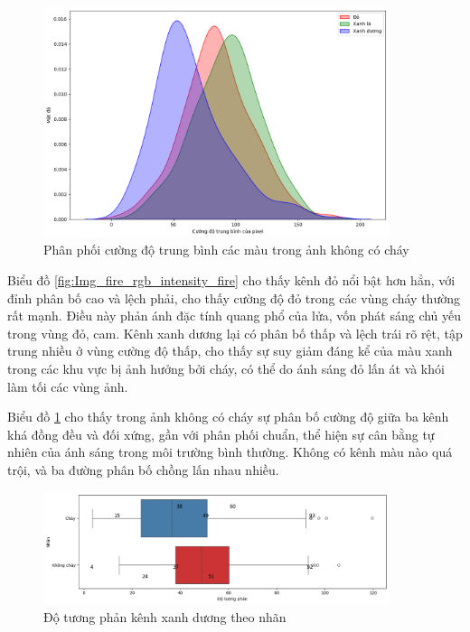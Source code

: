     \begin{figure}[htp]
        \centering
        \includegraphics[width=0.90\textwidth]{images/Img_fire_rgb_intensity_nonfire.png}
        \caption{Phân phối cường độ trung bình các màu trong ảnh không có cháy}
        \label{fig:Img_fire_rgb_intensity_nonfire}
    \end{figure}
    \FloatBarrier

    Biểu đồ \ref{fig:Img_fire_rgb_intensity_fire} cho thấy kênh đỏ nổi bật hơn hẳn, với đỉnh phân bố cao và lệch phải, cho thấy cường độ đỏ trong các vùng cháy thường rất mạnh. Điều này phản ánh đặc tính quang phổ của lửa, vốn phát sáng chủ yếu trong vùng đỏ, cam. Kênh xanh dương lại có phân bố thấp và lệch trái rõ rệt, tập trung nhiều ở vùng cường độ thấp, cho thấy sự suy giảm đáng kể của màu xanh trong các khu vực bị ảnh hưởng bởi cháy, có thể do ánh sáng đỏ lấn át và khói làm tối các vùng ảnh. 

    Biểu đồ \ref{fig:Img_fire_rgb_intensity_nonfire} cho thấy trong ảnh không có cháy sự phân bố cường độ giữa ba kênh khá đồng đều và đối xứng, gần với phân phối chuẩn, thể hiện sự cân bằng tự nhiên của ánh sáng trong môi trường bình thường. Không có kênh màu nào quá trội, và ba đường phân bố chồng lấn nhau nhiều.

    \begin{figure}[htp]
        \centering
        \includegraphics[width=0.90\textwidth]{images/Img_fire_rgb_blue_contrast.png}
        \caption{Độ tương phản kênh xanh dương theo nhãn}
        \label{fig:Img_fire_rgb_blue_contrast}
    \end{figure}
    \FloatBarrier

